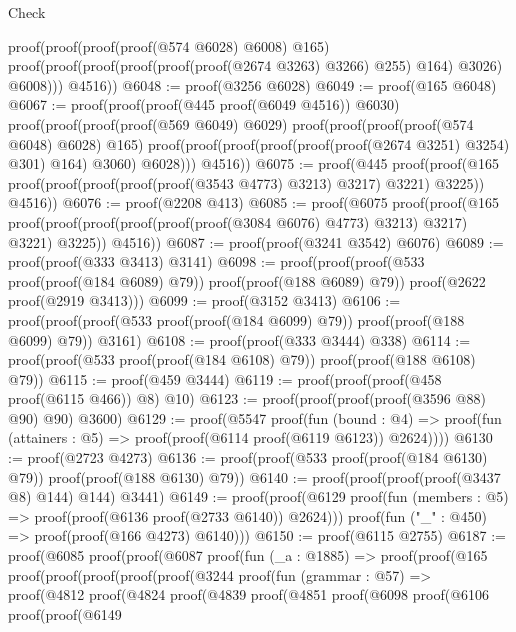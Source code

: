 \begin{lexlean}{Check}
\begin{coremodule}
            proof(proof(proof(proof(@574 @6028) @6008) @165)
                proof(proof(proof(proof(proof(proof(@2674 @3263) @3266) @255) @164) @3026) @6008)))
          @4516))
@6048 := proof(@3256 @6028)
@6049 := proof(@165 @6048)
@6067 := proof(proof(proof(@445 proof(@6049 @4516)) @6030)
      proof(proof(proof(proof(@569 @6049) @6029)
            proof(proof(proof(proof(@574 @6048) @6028) @165)
                proof(proof(proof(proof(proof(proof(@2674 @3251) @3254) @301) @164) @3060) @6028)))
          @4516))
@6075 := proof(@445
      proof(proof(@165 proof(proof(proof(proof(proof(@3543 @4773) @3213) @3217) @3221) @3225))
          @4516))
@6076 := proof(@2208 @413)
@6085 := proof(@6075
      proof(proof(@165
            proof(proof(proof(proof(proof(proof(@3084 @6076) @4773) @3213) @3217) @3221) @3225))
          @4516))
@6087 := proof(proof(@3241 @3542) @6076)
@6089 := proof(proof(@333 @3413) @3141)
@6098 := proof(proof(proof(@533 proof(proof(@184 @6089) @79)) proof(proof(@188 @6089) @79))
      proof(@2622 proof(@2919 @3413)))
@6099 := proof(@3152 @3413)
@6106 := proof(proof(proof(@533 proof(proof(@184 @6099) @79)) proof(proof(@188 @6099) @79)) @3161)
@6108 := proof(proof(@333 @3444) @338)
@6114 := proof(proof(@533 proof(proof(@184 @6108) @79)) proof(proof(@188 @6108) @79))
@6115 := proof(@459 @3444)
@6119 := proof(proof(proof(@458 proof(@6115 @466)) @8) @10)
@6123 := proof(proof(proof(proof(@3596 @88) @90) @90) @3600)
@6129 := proof(@5547
      proof(fun (bound : @4) =>
        proof(fun (attainers : @5) => proof(proof(@6114 proof(@6119 @6123)) @2624))))
@6130 := proof(@2723 @4273)
@6136 := proof(proof(@533 proof(proof(@184 @6130) @79)) proof(proof(@188 @6130) @79))
@6140 := proof(proof(proof(proof(@3437 @8) @144) @144) @3441)
@6149 := proof(proof(@6129
        proof(fun (members : @5) => proof(proof(@6136 proof(@2733 @6140)) @2624)))
      proof(fun ("_" : @450) => proof(proof(@166 @4273) @6140)))
@6150 := proof(@6115 @2755)
@6187 := proof(@6085
      proof(proof(@6087
            proof(fun (_a : @1885) =>
              proof(proof(@165
                    proof(proof(proof(proof(proof(@3244
                                proof(fun (grammar : @57) =>
                                  proof(@4812
                                      proof(@4824
                                          proof(@4839
                                              proof(@4851
                                                  proof(@6098
                                                      proof(@6106
                                                          proof(proof(@6149

\end{coremodule}
\end{lexlean}
